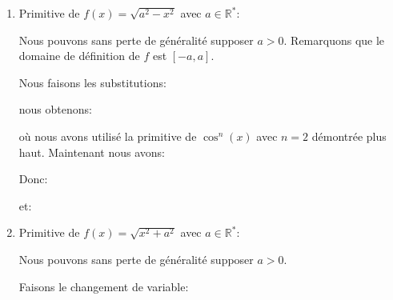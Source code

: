 \begin{enumerate}
		Nous pouvons sans perte de généralité supposer  $a>0$. Remarquons que le domaine de définition de $f$ est $]-\infty,-a] \cup [a,+\infty[$.
		
		Nous allons déterminer une primitive de $f$ uniquement sur l'intervalle $[a,+\infty[$ (car c'est celle dont nous aurons besoin dans certains chapitres).
		
		Faisons le changement de variable:
		
		avec donc:
		
		où nous considérons la fonction $\cosh: \mathbb{R}^+ \rightarrow [1,+\infty[$ avec pour réciproque la fonction  $\text{arccosh}:[1,+\infty[ \rightarrow \mathbb{R}^+$ donnée par ():
		
		Nous obtenons alors en utilisant la primitive de $\sinh^2(x)$:
		
		mais () comme:
		
		Donc:
		
		et en utilisant un autre résultat de la section de Trigonométrie:
		
		nous avons alors:
		
		étant donné que les primitives sont données à une constante près, nous pouvons écrire:
		
		pour $x\geq a$. $F$ est donc une primitive de $\sqrt{x^2-a^2}$ sur l'intervalle $[a,+\infty[$.
		
		\item Primitive de $f(x)=\sqrt{a^2-x^2}$ avec $a\in \mathbb{R}^*$:
		
		Nous pouvons sans perte de généralité supposer  $a>0$. Remarquons que le domaine de définition de $f$ est $[-a, a]$.
		
		Nous faisons les substitutions:
		
		nous obtenons:
		
		où nous avons utilisé la primitive de $\cos^n (x)$ avec $n=2$ démontrée plus haut. Maintenant nous avons:
		
		Donc:
		
		et:
		

		\item Primitive de $f(x)=\sqrt{x^2+a^2}$ avec $a\in \mathbb{R}^*$:
		
		Nous pouvons sans perte de généralité supposer $a>0$.
		
		Faisons le changement de variable:
		

\end{enumerate}
